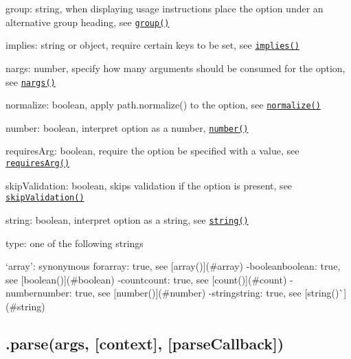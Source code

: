 \begin{DoxyItemize}
\item {\ttfamily group}\+: string, when displaying usage instructions place the option under an alternative group heading, see \href{#group}{\tt {\ttfamily group()}}
\item {\ttfamily implies}\+: string or object, require certain keys to be set, see \href{#implies}{\tt {\ttfamily implies()}}
\item {\ttfamily nargs}\+: number, specify how many arguments should be consumed for the option, see \href{#nargs}{\tt {\ttfamily nargs()}}
\item {\ttfamily normalize}\+: boolean, apply {\ttfamily path.\+normalize()} to the option, see \href{#normalize}{\tt {\ttfamily normalize()}}
\item {\ttfamily number}\+: boolean, interpret option as a number, \href{#number}{\tt {\ttfamily number()}}
\item {\ttfamily requires\+Arg}\+: boolean, require the option be specified with a value, see \href{#requiresArg}{\tt {\ttfamily requires\+Arg()}}
\item {\ttfamily skip\+Validation}\+: boolean, skips validation if the option is present, see \href{#skipValidation}{\tt {\ttfamily skip\+Validation()}}
\item {\ttfamily string}\+: boolean, interpret option as a string, see \href{#string}{\tt {\ttfamily string()}}
\item {\ttfamily type}\+: one of the following strings
\begin{DoxyItemize}
\item `\textquotesingle{}array'{\ttfamily \+: synonymous for}array\+: true{\ttfamily , see \mbox{[}}array(){\ttfamily \mbox{]}(\#array) -\/}\textquotesingle{}booleanboolean\+: true{\ttfamily , see \mbox{[}}boolean(){\ttfamily \mbox{]}(\#boolean) -\/}\textquotesingle{}countcount\+: true{\ttfamily , see \mbox{[}}count(){\ttfamily \mbox{]}(\#count) -\/}\textquotesingle{}numbernumber\+: true{\ttfamily , see \mbox{[}}number(){\ttfamily \mbox{]}(\#number) -\/}\textquotesingle{}stringstring\+: true{\ttfamily , see \mbox{[}}string()\`{}\mbox{]}(\#string)
\end{DoxyItemize}
\end{DoxyItemize}

\subsection*{.parse(args, \mbox{[}context\mbox{]}, \mbox{[}parse\+Callback\mbox{]}) }

